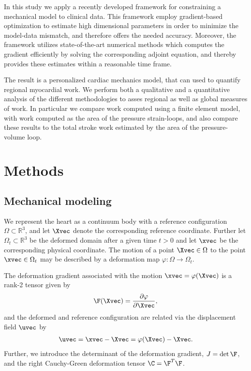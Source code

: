 In this study we apply a recently developed framework
\cite{balaban2017high} for constraining a mechanical model to clinical
data. This framework employ gradient-based optimization to estimate high
dimensional parameters in order to minimize the model-data mismatch,
and therefore offers the needed accuracy. Moreover, the framework
utilizes state-of-the-art numerical methods which computes the
gradient efficiently by solving the corresponding adjoint equation,
and thereby provides these estimates within a reasonable time frame. 

The result is a personalized cardiac mechanics model, that can used to quantify
regional myocardial work. We perform both a qualitative and a
quantitative analysis of the different methodologies to asses regional
as well as global measures of work. In particular we compare work
computed using a finite element model, with work computed as the area
of the pressure strain-loops, and also compare these results
to the total stroke work estimated by the area of the
pressure-volume loop.



\section{Methods}


\subsection{Mechanical modeling}
\label{sec:mechanical_modeling}
We represent the heart as a continuum body with a reference configuration 
$\Omega \subset \mathbb{R}^3$, and let $\Xvec$ denote the
corresponding reference coordinate. Further let $ \Omega_t
\subset \mathbb{R}^3$ be the deformed domain after a given time $t >
0$ and let $\xvec$ be the corresponding physical coordinate.  The
motion of a point $\Xvec \in  \Omega$ to the  point $\xvec \in
\Omega_t$ may be described by a deformation map  $\varphi :
\Omega  \rightarrow \Omega_t$. 

The deformation gradient associated with the motion $\xvec =
\varphi(\Xvec)$ is a rank-2 tensor given by 
\begin{align}
\F(\Xvec) = \frac{\partial \varphi}{\partial \Xvec},
\end{align}
and the deformed and reference configuration are related via the
displacement field  $\uvec$ by 
\begin{align}  
\uvec = \xvec-\Xvec = \varphi( \Xvec) -\Xvec.
\end{align}
Further, we introduce the determinant of the deformation gradient, $J =
\det \F$, and the right Cauchy-Green deformation tensor $\C = \F^T \F$.

